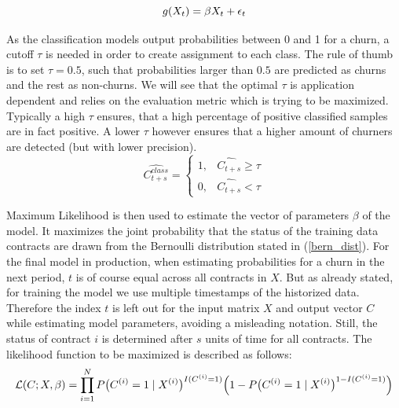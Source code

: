 \documentclass[12pt,titlepage]{article}
\begin{document}
\begin{equation} \label{lin_model}
    g(X_{t}) = \beta X_{t} + \epsilon_{t} \\
\end{equation}

As the classification models output probabilities between 0 and 1 for a churn, a cutoff $\tau$ is needed in order to create assignment to each class. The rule of thumb is to set $\tau = 0.5$, such that probabilities larger than $0.5$ are predicted as churns and the rest as non-churns. We will see that the optimal $\tau$ is application dependent and relies on the evaluation metric which is trying to be maximized. Typically a high $\tau$ ensures, that a high percentage of positive classified samples are in fact positive. A lower $\tau$ however ensures that a higher amount of churners are detected (but with lower precision). \\

\begin{equation} \label{tau}
    \widehat{C_{t+s}^{class}} = \begin{cases}
        1,& \widehat{C_{t+s}} \geq \tau \\
        0,& \widehat{C_{t+s}} < \tau
    \end{cases}
\end{equation}

Maximum Likelihood is then used to estimate the vector of parameters $\beta$ of the model. It maximizes the joint probability that the status of the training data contracts are drawn from the Bernoulli distribution stated in (\ref{bern_dist}). For the final model in production, when estimating probabilities for a churn in the next period, $t$ is of course equal across all contracts in $X$. But as already stated, for training the model we use multiple timestamps of the historized data. Therefore the index $t$ is left out for the input matrix $X$ and output vector $C$ while estimating model parameters, avoiding a misleading notation. Still, the status of contract $i$ is determined after $s$ units of time for all contracts. The likelihood function to be maximized is described as follows: \\

\begin{equation} \label{logistic_MLE}
    \mathcal{L}(C; X, \beta) = \prod_{i=1}^{N}P\big(C^{(i)}=1\mid X^{(i)}\big)^{I(C^{(i)}=1)}\Big(1 - P\big(C^{(i)}=1\mid X^{(i)}\big)^{1 - I(C^{(i)}=1)}\Big) \\
\end{equation}
\end{document}
